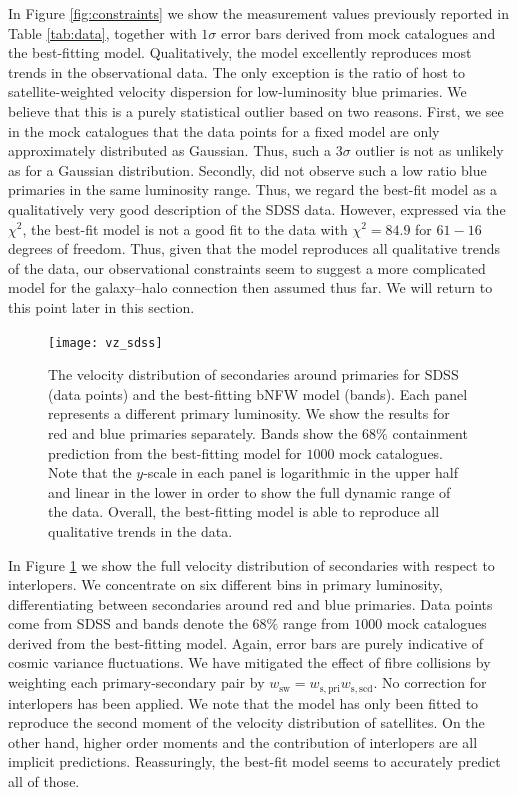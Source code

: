 \documentclass[fleqn,usenatbib,useAMS]{mnras}
\begin{document}
In Figure \ref{fig:constraints} we show the measurement values previously reported in Table \ref{tab:data}, together with $1\sigma$ error bars derived from mock catalogues and the best-fitting model. Qualitatively, the model excellently reproduces most trends in the observational data. The only exception is the ratio of host to satellite-weighted velocity dispersion for low-luminosity blue primaries. We believe that this is a purely statistical outlier based on two reasons. First, we see in the mock catalogues that the data points for a fixed model are only approximately distributed as Gaussian. Thus, such a $3 \sigma$ outlier is not as unlikely as for a Gaussian distribution. Secondly, \cite{More+11} did not observe such a low ratio blue primaries in the same luminosity range. Thus, we regard the best-fit model as a qualitatively very good description of the SDSS data. However, expressed via the $\chi^2$, the best-fit model is not a good fit to the data with $\chi^2 = 84.9$ for $61 - 16$ degrees of freedom. Thus, given that the model reproduces all qualitative trends of the data, our observational constraints seem to suggest a more complicated model for the galaxy--halo connection then assumed thus far. We will return to this point later in this section.

\begin{figure}
	\centering
	\texttt{[image: vz\_sdss]}
	\caption{The velocity distribution of secondaries around primaries for SDSS (data points) and the best-fitting bNFW model (bands). Each panel represents a different primary luminosity. We show the results for red and blue primaries separately. Bands show the $68\%$ containment prediction from the best-fitting model for $1000$ mock catalogues. Note that the $y$-scale in each panel is logarithmic in the upper half and linear in the lower in order to show the full dynamic range of the data. Overall, the best-fitting model is able to reproduce all qualitative trends in the data.}
	\label{fig:vz}
\end{figure}

In Figure \ref{fig:vz} we show the full velocity distribution of secondaries with respect to interlopers. We concentrate on six different bins in primary luminosity, differentiating between secondaries around red and blue primaries. Data points come from SDSS and bands denote the $68\%$ range from $1000$ mock catalogues derived from the best-fitting model. Again, error bars are purely indicative of cosmic variance fluctuations. We have mitigated the effect of fibre collisions by weighting each primary-secondary pair by $w_{\mathrm{sw}} = w_{\mathrm{s, pri}} w_{\mathrm{s, scd}}$. No correction for interlopers has been applied. We note that the model has only been fitted to reproduce the second moment of the velocity distribution of satellites. On the other hand, higher order moments and the contribution of interlopers are all implicit predictions. Reassuringly, the best-fit model seems to accurately predict all of those.
\end{document}
